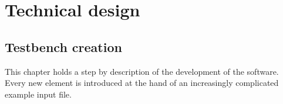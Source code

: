 
\chapter{Technical design} \label{TD}
\section{Testbench creation}
This chapter holds a step by description of the development of the software. Every new element is introduced at the hand of an increasingly complicated example input file.
